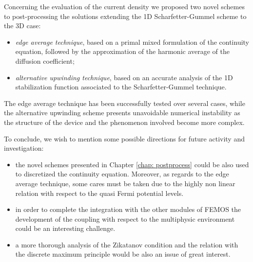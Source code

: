 Concerning the evaluation of the current density we proposed two novel schemes to post-processing the solutions extending the 1D Scharfetter-Gummel scheme to the 3D case:
\begin{itemize}
\item \textit{edge average technique}, based on a primal mixed formulation of the continuity equation, followed by the approximation of the harmonic average of the diffusion coefficient;
\item \textit{alternative upwinding technique}, based on an accurate analysis of the 1D stabilization function associated to the Scharfetter-Gummel technique.   
\end{itemize}
The edge average technique has been successfully tested over several cases, while the alternative upwinding scheme presents unavoidable numerical instability as the structure of the device and the phenomenon involved become more complex.

\vspace{1cm}

To conclude, we wish to mention some possible directions for future activity and investigation:
\begin{itemize}
\item the novel schemes presented in Chapter \ref{chap: postprocess} could be also used to discretized the continuity equation. Moreover, as regards to the edge average technique, some cares must be taken due to the highly non linear relation with respect to the quasi Fermi potential levels.

\item in order to complete the integration with the other modules of FEMOS the development of the coupling with respect to the multiphysic environment could be an interesting challenge.

\item a more thorough analysis of the Zikatanov condition and the relation with the discrete maximum principle would be also an issue of great interest.

\end{itemize}